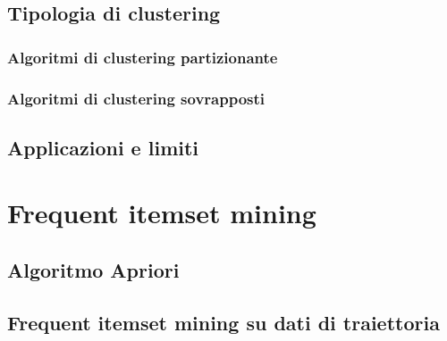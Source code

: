 \subsection{Tipologia di clustering}

\subsubsection{Algoritmi di clustering partizionante}\label{subsec:partitioning}


\subsubsection{Algoritmi di clustering
sovrapposti}\label{subsec:overlapping}


\subsection{Applicazioni e limiti}\label{subsec:problem:applicationandlimits}



\section{Frequent itemset mining}\label{sec:fim}


\subsection{Algoritmo Apriori}\label{subsec:apriori}


\subsection{Frequent itemset mining su dati di traiettoria}\label{subsec:fim-trajectory}



